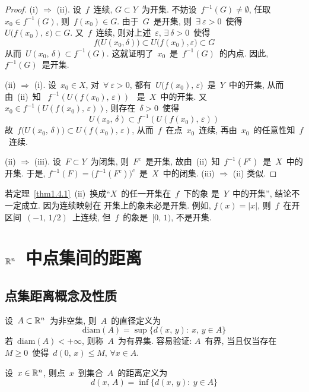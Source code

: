 \begin{proof}
(i) $\Rightarrow$ (ii). 设~$f$~连续, $G \subset Y$~为开集. 不妨设~$f^{-1}(G) \neq \emptyset$, 任取~$x_0 \in f^{-1}(G)$, 则~$f(x_0) \in G$. 由于~$G$~是开集, 则~$\exists~\varepsilon > 0$~使得~$U\big(f(x_0),\,\varepsilon\big) \subset G$. 又~$f$~连续, 则对上述~$\varepsilon$, $\exists~\delta > 0$~使得
\[
f\big(U(x_0, \delta)\big) \subset U\big(f(x_0), \varepsilon \big) \subset G
\]
从而~$U(x_0,\,\delta) \subset f^{-1}(G)$. 这就证明了~$x_0$~是~$f^{-1}(G)$~的内点. 因此, ~$f^{-1}(G)$~是开集.

(ii) $\Rightarrow$ (i). 设~$x_0 \in X$, 对~$\forall~\varepsilon > 0$, 都有~$U\big(f(x_0),\,\varepsilon\big)$~是~$Y$~中的开集, 从而由~(ii)~知
~$f^{-1}(U(f(x_0),\,\varepsilon))$~
是~$X$~中的开集. 又~$x_0 \in f^{-1}(U(f(x_0),\,\varepsilon))$, 则存在~$\delta > 0$~使得
\[
U(x_0,\,\delta) \subset f^{-1}(U(f(x_0),\,\varepsilon))
\]
故~$f\big(U(x_0,\,\delta)\big) \subset U(f(x_0),\,\varepsilon)$, 从而~$f$~在点~$x_0$~连续, 再由~$x_0$~的任意性知~$f$~连续.

(ii) $\Rightarrow$ (iii). 设~$F \subset Y$~为闭集, 则~$F^c$~是开集, 故由~(ii)~知~$f^{-1}(F^c)$~是~$X$~中的开集. 于是, $f^{-1}(F) = \big(f^{-1}(F^c)\big)^c$~是~$X$~中的闭集. (iii) $\Rightarrow$ (ii) 类似.

\end{proof}

\begin{remark}
若定理~\ref{thm1.4.1}~(ii)~换成``$X$~的任一开集在~$f$~下的象
是~$Y$~中的开集'', 结论不一定成立. 因为连续映射在
开集上的象未必是开集. 例如, $f(x) = |x|$, 则~$f$~在开区间~$(-1,\,1/2)$~上连续, 但~$f$~的象是~$[0,\,1)$, 不是开集.
\end{remark}

\section{$\mathbb{R}^n$~中点集间的距离}

\subsection{点集距离概念及性质}

设~$A \subset \mathbb{R}^n$~为非空集, 则~$A$~的直径定义为
\[
\mathrm{diam}(A) = \sup\big\{d(x,\,y):\: x,\,y \in A\big\}
\]
若~$\mathrm{diam}(A) < + \infty$, 则称~$A$~为有界集. 容易验证: $A$~有界, 当且仅当存在~$M \geqslant 0$~使得~$d(0,\,x) \leqslant M, \, \forall x \in A$.

设~$x \in \mathbb{R}^n$, 则点~$x$~到集合~$A$~的距离定义为
\[
d(x,\,A) = \inf\big\{d(x,\,y):\: y \in A\big\}
\]

